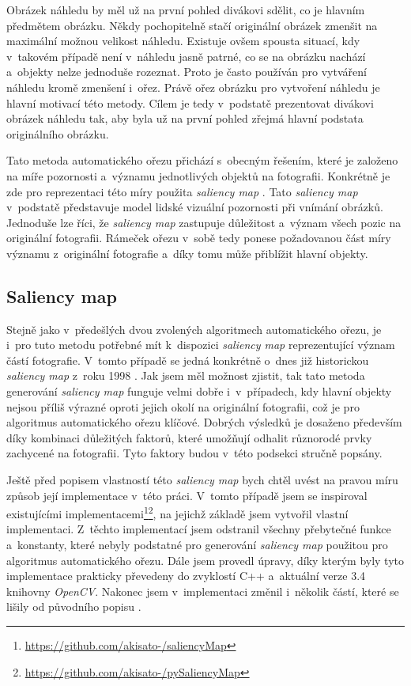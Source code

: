 Obrázek náhledu by měl už na první pohled divákovi sdělit, co je hlavním předmětem obrázku. Někdy pochopitelně stačí originální obrázek zmenšit na maximální možnou velikost náhledu. Existuje ovšem spousta situací, kdy v~takovém případě není v~náhledu jasně patrné, co se na obrázku nachází a~objekty nelze jednoduše rozeznat. Proto je často používán pro vytváření náhledu kromě zmenšení i~ořez. Právě ořez obrázku pro vytvoření náhledu je hlavní motivací této metody. Cílem je tedy v~podstatě prezentovat divákovi obrázek náhledu tak, aby byla už na první pohled zřejmá hlavní podstata originálního obrázku.

Tato metoda automatického ořezu přichází s~obecným řešením, které je založeno na míře pozornosti a~významu jednotlivých objektů na fotografii. Konkrétně je zde pro reprezentaci této míry použita \emph{saliency map} \cite{Itti1998}. Tato \emph{saliency map} v~podstatě představuje model lidské vizuální pozornosti při vnímání obrázků. Jednoduše lze říci, že \emph{saliency map} zastupuje důležitost a~význam všech pozic na originální fotografii. Rámeček ořezu v~sobě tedy ponese požadovanou část míry významu z~originální fotografie a~díky tomu může přiblížit hlavní objekty.

\subsection{Saliency map}
Stejně jako v~předešlých dvou zvolených algoritmech automatického ořezu, je i~pro tuto metodu potřebné mít k~dispozici \emph{saliency map} reprezentující význam částí fotografie. V~tomto případě se jedná konkrétně o~dnes již historickou \emph{saliency map} z~roku 1998 \cite{Itti1998}. Jak jsem měl možnost zjistit, tak tato metoda generování \emph{saliency map} funguje velmi dobře i~v~případech, kdy hlavní objekty nejsou příliš výrazné oproti jejich okolí na originální fotografii, což je pro algoritmus automatického ořezu klíčové. Dobrých výsledků je dosaženo především díky kombinaci důležitých faktorů, které umožňují odhalit různorodé prvky zachycené na fotografii. Tyto faktory budou v~této podsekci stručně popsány.

Ještě před popisem vlastností této \emph{saliency map} bych chtěl uvést na pravou míru způsob její implementace v~této práci. V~tomto případě jsem se inspiroval existujícími implementacemi\footnote{\url{https://github.com/akisato-/saliencyMap}}\footnote{\url{https://github.com/akisato-/pySaliencyMap}}, na jejichž základě jsem vytvořil vlastní implementaci. Z~těchto implementací jsem odstranil všechny přebytečné funkce a~konstanty, které nebyly podstatné pro generování \emph{saliency map} použitou pro algoritmus automatického ořezu. Dále jsem provedl úpravy, díky kterým byly tyto implementace prakticky převedeny do zvyklostí C++ a~aktuální verze 3.4 knihovny \emph{OpenCV}. Nakonec jsem v~implementaci změnil i~několik částí, které se lišily od původního popisu \cite{Itti1998}.

